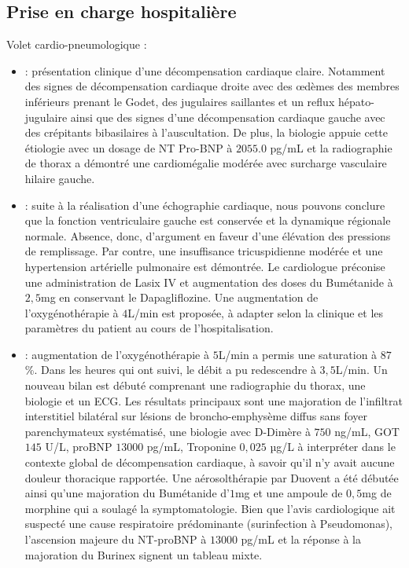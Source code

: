 \subsection{Prise en charge hospitalière}
Volet cardio-pneumologique : 
\begin{itemize}[label=\textbullet]
    \item {} : présentation clinique d’une décompensation cardiaque claire. Notamment des signes de décompensation cardiaque droite avec des œdèmes des membres inférieurs prenant le Godet, des jugulaires saillantes et un reflux hépato-jugulaire ainsi que des signes d’une décompensation cardiaque gauche avec des crépitants bibasilaires à l’auscultation. De plus, la biologie appuie cette étiologie avec un dosage de NT Pro-BNP à $2055.0$ pg/mL et la radiographie de thorax a démontré une cardiomégalie modérée avec surcharge vasculaire hilaire gauche.
    \item  {} : suite à la réalisation d’une échographie cardiaque, nous pouvons conclure que la fonction ventriculaire gauche est conservée et la dynamique régionale normale. Absence, donc, d’argument en faveur d’une élévation des pressions de remplissage. Par contre, une insuffisance tricuspidienne modérée et une hypertension artérielle pulmonaire est démontrée. Le cardiologue préconise une administration de Lasix IV et augmentation des doses du  Bumétanide  à $2,5$mg en conservant le Dapagliflozine. Une augmentation de l’oxygénothérapie à $4$L/min est proposée, à adapter selon la clinique et les paramètres du patient au cours de l’hospitalisation.
    \item {} : augmentation de l’oxygénothérapie à $5$L/min a permis une saturation à $87$\%. Dans les heures qui ont suivi, le débit a pu redescendre à $3,5$L/min. Un nouveau bilan est débuté comprenant une radiographie du thorax, une biologie et un ECG. Les résultats principaux sont une majoration de l’infiltrat interstitiel bilatéral sur lésions de broncho-emphysème diffus sans foyer parenchymateux systématisé, une biologie avec D-Dimère à $750$ ng/mL, GOT $145$ U/L, proBNP $13 000$ pg/mL, Troponine $0,025$ µg/L à interpréter dans le contexte global de décompensation cardiaque, à savoir qu’il n’y avait aucune douleur thoracique rapportée. Une aérosolthérapie par Duovent a été débutée ainsi qu’une majoration du Bumétanide d’$1$mg et une ampoule de $0,5$mg de morphine qui a soulagé la symptomatologie. Bien que l'avis cardiologique ait suspecté une cause respiratoire prédominante (surinfection à Pseudomonas), l'ascension majeure du NT-proBNP à $13 000$ pg/mL et la réponse à la majoration du Burinex signent un tableau mixte. 
\end{itemize}

